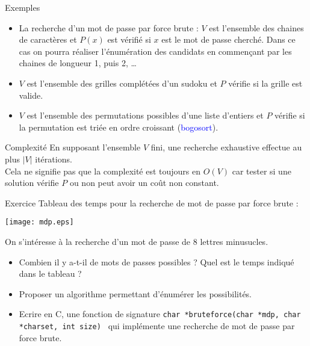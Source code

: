 \documentclass[10pt]{beamer}
\begin{document}
\begin{frame}[fragile]{\Ctitle}{\stitle}
	\begin{exampleblock}{Exemples}
		\begin{itemize}
			\item La recherche d'un mot de passe par force brute : $V$ est l'ensemble des chaines de caractères et $P(x)$ est vérifié si $x$ est le mot de passe cherché. Dans ce cas on pourra réaliser l'énumération des candidats en commençant par les chaines de longueur 1, puis 2, \dots
			\item<2-> $V$ est l'ensemble des grilles complétées d'un sudoku et $P$ vérifie si la grille est valide.
			\item<3-> $V$ est l'ensemble des permutations possibles d'une liste d'entiers et $P$ vérifie si la permutation est triée en ordre croissant (\textcolor{blue}{bogosort}).
		\end{itemize}
	\end{exampleblock}
\end{frame}

\begin{frame}[fragile]{\Ctitle}{\stitle}
	\begin{block}{Complexité}
		En supposant l'ensemble $V$ fini, une recherche exhaustive effectue au plus $|V|$ itérations.\\
		\textcolor{BrickRed}{\small \danger} Cela ne signifie pas que la complexité est toujours en $O(V)$ car tester si une solution vérifie $P$ ou non peut avoir un coût non constant.
	\end{block}
\end{frame}

\begin{frame}[fragile]{\Ctitle}{\stitle}
	\begin{exampleblock}{Exercice}
		Tableau des temps pour la recherche de mot de passe par force brute :
		\begin{center}
			\texttt{[image: mdp.eps]}
		\end{center}
		On s'intéresse à la recherche d'un mot de passe de 8 lettres minusucles.
		\begin{itemize}
			\item<2-> Combien il y a-t-il de mots de passes possibles ? Quel est le temps indiqué dans le tableau ?
			\item<3-> Proposer un algorithme permettant d'énumérer les possibilités.
			\item<4-> Ecrire en C, une fonction de signature \texttt{char *bruteforce(char *mdp, char *charset, int size)
				} qui implémente une recherche de mot de passe par force brute.
		\end{itemize}
	\end{exampleblock}
\end{frame}
\end{document}

